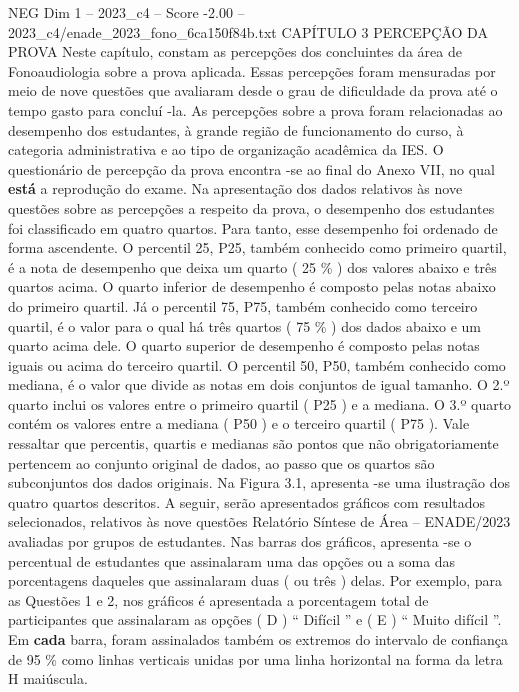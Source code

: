 \begin{textsample}{NEG Dim 1 – 2023\_c4 – Score -2.00 – 2023\_c4/enade\_2023\_fono\_6ca150f84b.txt}  \label{ex:f1_neg_247}
CAPÍTULO 3 PERCEPÇÃO DA PROVA Neste capítulo, constam as percepções dos concluintes da área de Fonoaudiologia sobre a prova aplicada.
Essas percepções foram mensuradas por meio de nove questões que avaliaram desde o grau de dificuldade da prova até o tempo gasto para concluí -la.
As percepções sobre a prova foram relacionadas ao desempenho dos estudantes, à grande região de funcionamento do curso, à categoria administrativa e ao tipo de organização acadêmica da IES.
O questionário de percepção da prova encontra -se ao final do Anexo VII, no qual \textbf{está} a reprodução do exame.
Na apresentação dos dados relativos às nove questões sobre as percepções a respeito da prova, o desempenho dos estudantes foi classificado em quatro quartos.
Para tanto, esse desempenho foi ordenado de forma ascendente.
O percentil 25, P25, também conhecido como primeiro quartil, é a nota de desempenho que deixa um quarto ( 25 \% ) dos valores abaixo e três quartos acima.
O quarto inferior de desempenho é composto pelas notas abaixo do primeiro quartil.
Já o percentil 75, P75, também conhecido como terceiro quartil, é o valor para o qual há três quartos ( 75 \% ) dos dados abaixo e um quarto acima dele.
O quarto superior de desempenho é composto pelas notas iguais ou acima do terceiro quartil.
O percentil 50, P50, também conhecido como mediana, é o valor que divide as notas em dois conjuntos de igual tamanho.
O 2.º quarto inclui os valores entre o primeiro quartil ( P25 ) e a mediana.
O 3.º quarto contém os valores entre a mediana ( P50 ) e o terceiro quartil ( P75 ).
Vale ressaltar que percentis, quartis e medianas são pontos que não obrigatoriamente pertencem ao conjunto original de dados, ao passo que os quartos são subconjuntos dos dados originais.
Na Figura 3.1, apresenta -se uma ilustração dos quatro quartos descritos.
A seguir, serão apresentados gráficos com resultados selecionados, relativos às nove questões Relatório Síntese de Área – ENADE/2023 avaliadas por grupos de estudantes.
Nas barras dos gráficos, apresenta -se o percentual de estudantes que assinalaram uma das opções ou a soma das porcentagens daqueles que assinalaram duas ( ou três ) delas.
Por exemplo, para as Questões 1 e 2, nos gráficos é apresentada a porcentagem total de participantes que assinalaram as opções ( D ) “ Difícil ” e ( E ) “ Muito difícil ”.
Em \textbf{cada} barra, foram assinalados também os extremos do intervalo de confiança de 95 \% como linhas verticais unidas por uma linha horizontal na forma da letra H maiúscula.

\end{textsample}
